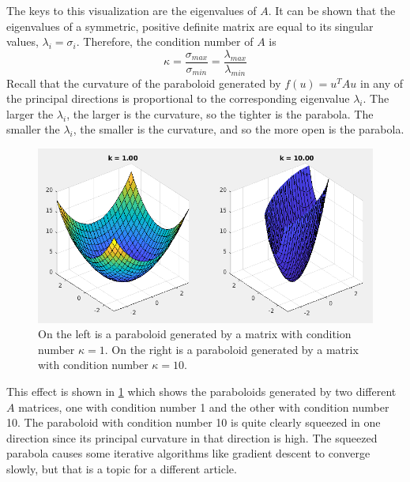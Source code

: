 \documentclass[onefignum,onetabnum]{siamart190516}
\begin{document}
The keys to this visualization are the eigenvalues of $A$.  It can be shown that
the eigenvalues of a symmetric, positive definite matrix are equal to its singular
values, $\lambda_i = \sigma_i$.  Therefore, the condition number of $A$ is
$$
\kappa = \frac{\sigma_{max}}{\sigma_{min}} = \frac{\lambda_{max}}{\lambda_{min}}
$$
Recall that the curvature of the paraboloid generated by $f(u) = u^T A u$ in any of
the principal directions is proportional to the corresponding eigenvalue $\lambda_i$.
The larger the $\lambda_i$, the larger is the curvature, so the tighter is the 
parabola.  The smaller the $\lambda_i$, the smaller is the curvature, and so the more open is the 
parabola.  
\begin{figure}[bht]
	\centering
	\includegraphics[width=0.8\columnwidth]{QuadFormCondNo.png}
	\caption{On the left is a paraboloid generated by a matrix with condition
		number $\kappa = 1$.   On the right is a paraboloid generated by a matrix with condition
		number $\kappa = 10$.}
	\label{fig:QuadFormCondNo}
\end{figure}
This effect is shown in \cref{fig:QuadFormCondNo} which shows the paraboloids generated
by two different $A$ matrices, one with condition number 1 and the other with condition
number 10.  The paraboloid with condition number 10 is quite clearly squeezed in one direction
since its principal curvature in that direction is high.  The squeezed parabola causes
some iterative algorithms like gradient descent to converge slowly, but that is a topic for
a different article.
\end{document}
